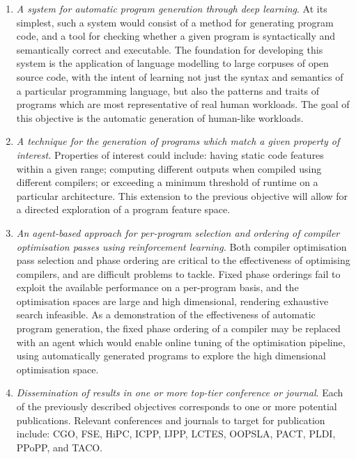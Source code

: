\begin{enumerate}
        \item \emph{A system for automatic program generation through deep learning}. At its simplest, such a system would consist of a method for generating program code, and a tool for checking whether a given program is syntactically and semantically correct and executable. The foundation for developing this system is the application of language modelling to large corpuses of open source code, with the intent of learning not just the syntax and semantics of a particular programming language, but also the patterns and traits of programs which are most representative of real human workloads. The goal of this objective is the automatic generation of human-like workloads.
        \item \emph{A technique for the generation of programs which match a given property of interest.} Properties of interest could include: having static code features within a given range; computing different outputs when compiled using different compilers; or exceeding a minimum threshold of runtime on a particular architecture. This extension to the previous objective will allow for a directed exploration of a program feature space.
        \item \emph{An agent-based approach for per-program selection and ordering of compiler optimisation passes using reinforcement learning.} Both compiler optimisation pass selection and phase ordering are critical to the effectiveness of optimising compilers, and are difficult problems to tackle. Fixed phase orderings fail to exploit the available performance on a per-program basis, and the optimisation spaces are large and high dimensional, rendering exhaustive search infeasible. As a demonstration of the effectiveness of automatic program generation, the fixed phase ordering of a compiler may be replaced with an agent which would enable online tuning of the optimisation pipeline, using automatically generated programs to explore the high dimensional optimisation space.
        \item \emph{Dissemination of results in one or more top-tier conference or journal}. Each of the previously described objectives corresponds to one or more potential publications. Relevant conferences and journals to target for publication include: CGO, FSE, HiPC, ICPP, IJPP, LCTES, OOPSLA, PACT, PLDI, PPoPP, and TACO.
\end{enumerate}


%
%
%
